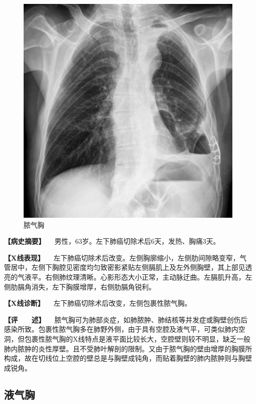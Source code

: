 \begin{figure}[!htbp]
 \centering
 \includegraphics{./images/Image00190.jpg}
 \captionsetup{justification=centering}
 \caption{脓气胸}
 \label{fig3-11-4}
  \end{figure} 

\textbf{【病史摘要】} 　男性，63岁。左下肺癌切除术后6天，发热、胸痛3天。

\textbf{【X线表现】}
　左下肺癌切除术后改变。左侧胸廓缩小，左侧肋间隙略变窄，气管居中，左侧下胸腔见密度均匀致密影紧贴左侧膈肌上及左外侧胸壁，其上部见透亮的气液平。右侧肺纹理清晰。心影形态大小正常，主动脉迂曲。左膈肌升高，左侧肋膈角消失，左下胸膜增厚，右侧肋膈角锐利。

\textbf{【X线诊断】} 　左下肺癌切除术后改变，左侧包裹性脓气胸。

\textbf{【评　　述】}
　脓气胸可为肺部炎症，如肺脓肿、肺结核等并发症或胸壁创伤后感染所致。包裹性脓气胸多在肺野外侧，由于具有空腔及液气平，可类似肺内空洞，但包裹性脓气胸的X线特点是液平面比较长大，空腔壁则较不明显，缺乏一般肺内脓肿的炎性厚壁。且不受肺叶解剖的限制。又由于脓气胸的壁由增厚的胸膜所构成，故在切线位上空腔的壁总是与胸壁成钝角，而贴着胸壁的肺内脓肿则与胸壁成锐角。

\subsection{液气胸}

